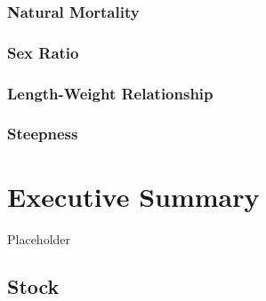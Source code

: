 \documentclass[11pt,
  english,
  a4paper,
]{article}
\begin{document}
\leavevmode\tagmcend\tagstructend


\hypertarget{natural-mortality-1}{%
\subsubsection{Natural Mortality}\label{natural-mortality-1}}

\leavevmode\tagmcend\tagstructend


\hypertarget{sex-ratio-1}{%
\subsubsection{Sex Ratio}\label{sex-ratio-1}}

\leavevmode\tagmcend\tagstructend


\hypertarget{length-weight-relationship-1}{%
\subsubsection{Length-Weight Relationship}\label{length-weight-relationship-1}}

\leavevmode\tagmcend\tagstructend


\hypertarget{steepness-1}{%
\subsubsection{Steepness}\label{steepness-1}}

\leavevmode\tagmcend\tagstructend


\hypertarget{executive-summary-2}{%
\section*{Executive Summary}\label{executive-summary-2}}

\leavevmode\tagmcend\tagstructend

Placeholder


\hypertarget{stock-2}{%
\subsection*{Stock}\label{stock-2}}
\end{document}
